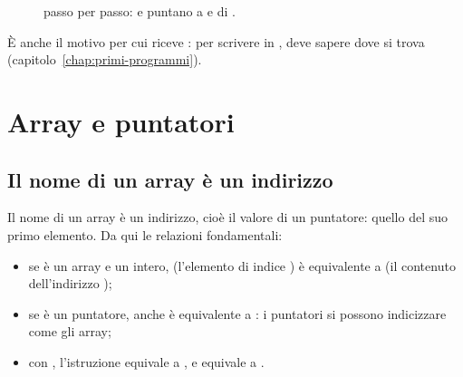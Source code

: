 \begin{figure}[H]
  \centering
  \caption{ passo per passo:  e  puntano a
            e  di .}
  \label{fig:swap}
\end{figure}

È anche il motivo per cui  riceve : per scrivere in
, deve sapere dove si trova (capitolo~\ref{chap:primi-programmi}).

\section{Array e puntatori}

\subsection{Il nome di un array è un indirizzo}

Il nome di un array è un indirizzo, cioè il valore di un puntatore: quello
del suo primo elemento. Da qui le relazioni fondamentali:

\begin{itemize}
  \item se  è un array e  un intero,  (l'elemento
        di indice ) è equivalente a  (il contenuto
        dell'indirizzo );
  \item se  è un puntatore, anche  è equivalente a
        : i puntatori si possono indicizzare come gli array;
  \item con , l'istruzione  equivale a
        , e  equivale a
        .
\end{itemize}

